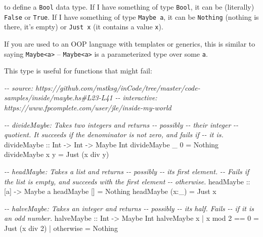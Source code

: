 \documentclass[]{article}
\newenvironment{Shaded}{}{}
\newcommand{\CommentTok}[1]{\textcolor[rgb]{0.38,0.63,0.69}{\textit{#1}}}
\newcommand{\DataTypeTok}[1]{\textcolor[rgb]{0.56,0.13,0.00}{#1}}
\newcommand{\DecValTok}[1]{\textcolor[rgb]{0.25,0.63,0.44}{#1}}
\newcommand{\FunctionTok}[1]{\textcolor[rgb]{0.02,0.16,0.49}{#1}}
\newcommand{\NormalTok}[1]{#1}
\newcommand{\OperatorTok}[1]{\textcolor[rgb]{0.40,0.40,0.40}{#1}}
\newcommand{\OtherTok}[1]{\textcolor[rgb]{0.00,0.44,0.13}{#1}}
\begin{document}
to define a \texttt{Bool} data type. If I have something of type \texttt{Bool},
it can be (literally) \texttt{False} or \texttt{True}. If I have something of
type \texttt{Maybe\ a}, it can be \texttt{Nothing} (nothing is there, it's
empty) or \texttt{Just\ x} (it contains a value \texttt{x}).

If you are used to an OOP language with templates or generics, this is similar
to saying \texttt{Maybe\textless{}a\textgreater{}} --
\texttt{Maybe\textless{}a\textgreater{}} is a parameterized type over some
\texttt{a}.

This type is useful for functions that might fail:

\begin{Shaded}
\begin{Highlighting}[]
\CommentTok{{-}{-} source: https://github.com/mstksg/inCode/tree/master/code{-}samples/inside/maybe.hs\#L23{-}L41}
\CommentTok{{-}{-} interactive: https://www.fpcomplete.com/user/jle/inside{-}my{-}world}

\CommentTok{{-}{-} divideMaybe: Takes two integers and returns {-}{-} possibly {-}{-} their integer}
\CommentTok{{-}{-}      quotient. It succeeds if the denominator is not zero, and fails if}
\CommentTok{{-}{-}      it is.}
\OtherTok{divideMaybe ::} \DataTypeTok{Int} \OtherTok{{-}\textgreater{}} \DataTypeTok{Int} \OtherTok{{-}\textgreater{}} \DataTypeTok{Maybe} \DataTypeTok{Int}
\NormalTok{divideMaybe \_ }\DecValTok{0} \OtherTok{=} \DataTypeTok{Nothing}
\NormalTok{divideMaybe x y }\OtherTok{=} \DataTypeTok{Just}\NormalTok{ (x }\OtherTok{\textasciigrave{}div\textasciigrave{}}\NormalTok{ y)}

\CommentTok{{-}{-} headMaybe: Takes a list and returns {-}{-} possibly {-}{-} its first element.}
\CommentTok{{-}{-}      Fails if the list is empty, and succeeds with the first element}
\CommentTok{{-}{-}      otherwise.}
\OtherTok{headMaybe ::}\NormalTok{ [a] }\OtherTok{{-}\textgreater{}} \DataTypeTok{Maybe}\NormalTok{ a}
\NormalTok{headMaybe []    }\OtherTok{=} \DataTypeTok{Nothing}
\NormalTok{headMaybe (x}\OperatorTok{:}\NormalTok{\_) }\OtherTok{=} \DataTypeTok{Just}\NormalTok{ x}

\CommentTok{{-}{-} halveMaybe: Takes an integer and returns {-}{-} possibly {-}{-} its half.  Fails}
\CommentTok{{-}{-}      if it is an odd number.}
\OtherTok{halveMaybe ::} \DataTypeTok{Int} \OtherTok{{-}\textgreater{}} \DataTypeTok{Maybe} \DataTypeTok{Int}
\NormalTok{halveMaybe x }\OperatorTok{|}\NormalTok{ x }\OtherTok{\textasciigrave{}mod\textasciigrave{}} \DecValTok{2} \OperatorTok{==} \DecValTok{0} \OtherTok{=} \DataTypeTok{Just}\NormalTok{ (x }\OtherTok{\textasciigrave{}div\textasciigrave{}} \DecValTok{2}\NormalTok{)}
             \OperatorTok{|} \FunctionTok{otherwise}      \OtherTok{=} \DataTypeTok{Nothing}
\end{Highlighting}
\end{Shaded}
\end{document}
